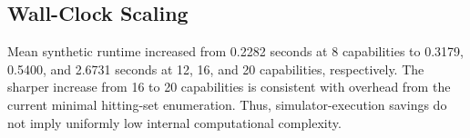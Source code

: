\subsection{Wall-Clock Scaling}

Mean synthetic runtime increased from 0.2282 seconds at 8 capabilities to 0.3179, 0.5400, and 2.6731 seconds at 12, 16, and 20 capabilities, respectively. The sharper increase from 16 to 20 capabilities is consistent with overhead from the current minimal hitting-set enumeration. Thus, simulator-execution savings do not imply uniformly low internal computational complexity.

